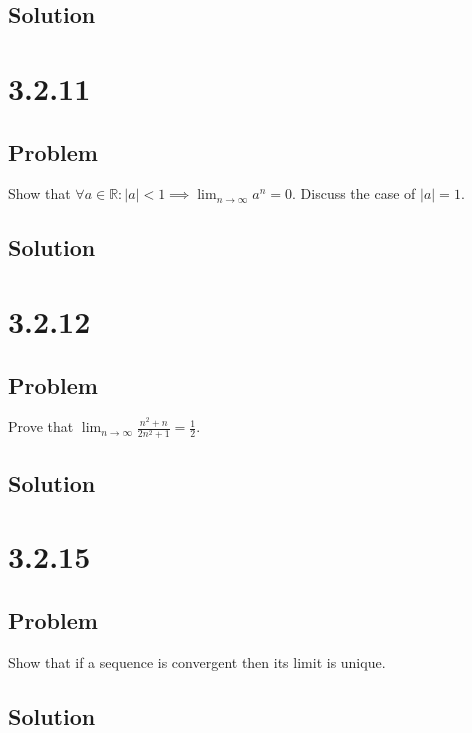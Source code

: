 \documentclass[12pt]{article}
\newcommand{\abs}  [1]{\left|       #1 \right|      }
\newcommand{\R}    [0]{\mathbb{R}                   }
\begin{document}
\subsection*{Solution}




\section*{3.2.11}

\subsection*{Problem}
Show that $\forall a \in \R : \abs{a} < 1 \implies \lim_{n \to \infty} a^n = 0$. Discuss the case of $\abs{a} = 1$.

\subsection*{Solution}




\section*{3.2.12}

\subsection*{Problem}
Prove that $\lim_{n \to \infty} \frac{n^2 + n}{2n^2 + 1} = \frac{1}{2}$.

\subsection*{Solution}




\section*{3.2.15}

\subsection*{Problem}
Show that if a sequence is convergent then its limit is unique.

\subsection*{Solution}
\end{document}
